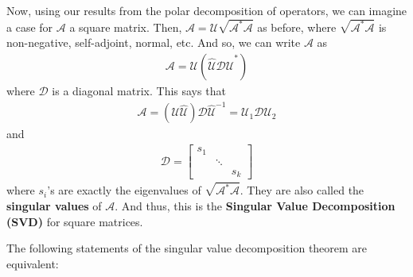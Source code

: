 \documentclass{book}
\theoremstyle{definition}
\newcommand{\Uni}{\mathcal{U}}
\newcommand{\A}{\mathcal{A}}
\newcommand{\lp}{\left(}
\newcommand{\rp}{\right)}
\begin{document}
Now, using our results from the polar decomposition of operators, we can imagine a case for $\A$ a square matrix. Then, $\A = \Uni \sqrt{\A^*\A}$ as before, where $\sqrt{\A^*\A}$ is non-negative, self-adjoint, normal, etc. And so, we can write $\A$ as
\begin{align*}
\A = \Uni \lp \hat{\Uni} \mathcal{D} \hat{\Uni}^* \rp
\end{align*}
where $\mathcal{D}$ is a diagonal matrix. This says that 
\begin{align*}
\A = (\Uni \hat{\Uni}) \mathcal{D} \hat{\Uni}^{-1} = \Uni_1 \mathcal{D} \Uni_2
\end{align*}
and 
\begin{align*}
\mathcal{D} = \begin{bmatrix}
s_1 & & \\
& \ddots & \\
& & s_k
\end{bmatrix}
\end{align*}
where $s_i$'s are exactly the eigenvalues of $\sqrt{\A^*\A}$. They are also called the \textbf{singular values} of $\A$. And thus, this is the \textbf{Singular Value Decomposition (SVD)} for square matrices. 


The following statements of the singular value decomposition theorem are equivalent:
\end{document}
